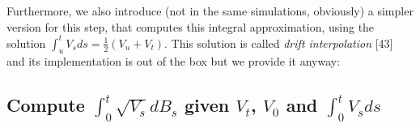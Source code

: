 \documentclass[12pt,twoside]{reedthesis}
\theoremstyle{definition}
\theoremstyle{definition}
\theoremstyle{remark}
\begin{document}
  \footnotesize
  \begin{Shaded}
  \begin{Highlighting}[]
  \StringTok{ }\OperatorTok{-}
  \StringTok{ }
  \StringTok{ }
  \StringTok{ }\OperatorTok{-}\StringTok{ }
      \OperatorTok{==}\StringTok{ }\OperatorTok{-}\NormalTok{)}
  \StringTok{ }\OperatorTok{-}\NormalTok{)}
      \OperatorTok{==}\StringTok{ }\NormalTok{)}
  \StringTok{ }
      \NormalTok{(}
                      \NormalTok{)}\OperatorTok{$}
  \NormalTok{  \}}
  \StringTok{ }\OperatorTok{::}
  \end{Highlighting}
  \end{Shaded}
  \normalsize
  
  Furthermore, we also introduce (not in the same simulations, obviously)
  a simpler version for this step, that computes this integral
  approximation, using the solution
  \(\int_{u}^{t}{V_s ds} = \frac{1}{2} \left( V_u + V_t \right)\). This
  solution is called \emph{drift interpolation} {[}43{]} and its
  implementation is out of the box but we provide it anyway:
  \begin{Shaded}
  \begin{Highlighting}[]
  \StringTok{ }\OperatorTok{*}\StringTok{ }\NormalTok{((}\OperatorTok{/}\NormalTok{) }\OperatorTok{*}\StringTok{ }\OperatorTok{+}\StringTok{ }\NormalTok{(}\OperatorTok{/}\NormalTok{) }\OperatorTok{*}\StringTok{ }
  \end{Highlighting}
  \end{Shaded}
  \subsection{\texorpdfstring{Compute \(\int_0^t \sqrt{V_s}dB_s\) given
  \(V_t\), \(V_0\) and
  \(\int_0^t V_sds\)}{Compute \textbackslash{}int\_0\^{}t \textbackslash{}sqrt\{V\_s\}dB\_s given V\_t, V\_0 and \textbackslash{}int\_0\^{}t V\_sds}}\label{compute-int_0t-sqrtv_sdb_s-given-v_t-v_0-and-int_0t-v_sds}
  
\end{document}
